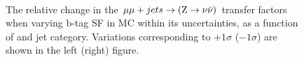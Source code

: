 \begin{figure}[]
  \centering
   ~~
  \\

  \caption{\label{fig:tfSyst_bsf_mumuToZinv} The relative change in
  the $\mmj \rightarrow (\znunu)$ transfer
  factors when varying b-tag SF in MC within its uncertainties, as a function of \scalht and jet category. 
  Variations corresponding to $+1\sigma$ ($-1\sigma$) are shown in the left (right) figure. 
  }
\end{figure}

